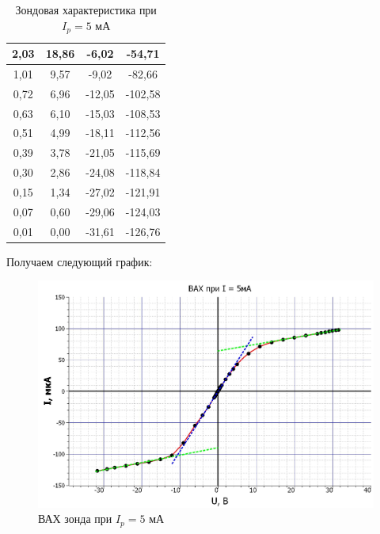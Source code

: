 \documentclass[a4paper,12pt]{article} %
\begin{document}
\begin{table}[h!]
\begin{tabular}{|cc|cc|}
			\multicolumn{1}{|c|}{2,03}    & 18,86     & \multicolumn{1}{c|}{-6,02}   & -54,71    \\ \hline
			\multicolumn{1}{|c|}{1,01}    & 9,57      & \multicolumn{1}{c|}{-9,02}   & -82,66    \\ \hline
			\multicolumn{1}{|c|}{0,72}    & 6,96      & \multicolumn{1}{c|}{-12,05}  & -102,58   \\ \hline
			\multicolumn{1}{|c|}{0,63}    & 6,10      & \multicolumn{1}{c|}{-15,03}  & -108,53   \\ \hline
			\multicolumn{1}{|c|}{0,51}    & 4,99      & \multicolumn{1}{c|}{-18,11}  & -112,56   \\ \hline
			\multicolumn{1}{|c|}{0,39}    & 3,78      & \multicolumn{1}{c|}{-21,05}  & -115,69   \\ \hline
			\multicolumn{1}{|c|}{0,30}    & 2,86      & \multicolumn{1}{c|}{-24,08}  & -118,84   \\ \hline
			\multicolumn{1}{|c|}{0,15}    & 1,34      & \multicolumn{1}{c|}{-27,02}  & -121,91   \\ \hline
			\multicolumn{1}{|c|}{0,07}    & 0,60      & \multicolumn{1}{c|}{-29,06}  & -124,03   \\ \hline
			\multicolumn{1}{|c|}{0,01}    & 0,00      & \multicolumn{1}{c|}{-31,61}  & -126,76   \\ \hline
		\end{tabular}
	\caption{Зондовая характеристика при $I_p = 5$ мА}
\end{table}

Получаем следующий график:
\newpage

\begin{figure}[h!]
	\centering
	\includegraphics[scale=0.7]{Pictures/ВАХ_2.jpg}
	\caption{ВАХ зонда при $I_p = 5$ мА}
\end{figure}
\end{document}

